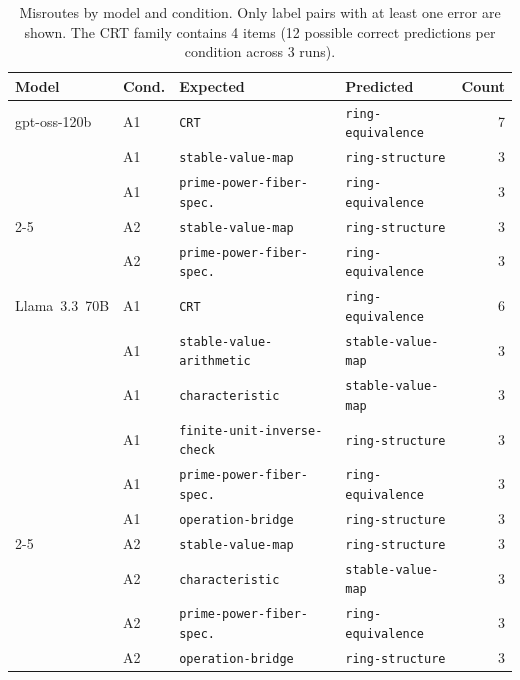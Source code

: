 \documentclass[11pt]{article}
\begin{document}
\begin{table}[htbp]
\centering
\caption{Misroutes by model and condition. Only label pairs with at least one
         error are shown. The CRT family contains 4 items (12 possible correct
         predictions per condition across 3 runs).}
\label{tab:misroutes}
\begin{tabular}{llll r}
\toprule
\textbf{Model} & \textbf{Cond.} & \textbf{Expected} & \textbf{Predicted} & \textbf{Count} \\
\midrule
gpt-oss-120b & A1 & \texttt{CRT}                       & \texttt{ring-equivalence}  & 7 \\
             & A1 & \texttt{stable-value-map}          & \texttt{ring-structure}    & 3 \\
             & A1 & \texttt{prime-power-fiber-spec.}   & \texttt{ring-equivalence}  & 3 \\
\cmidrule{2-5}
             & A2 & \texttt{stable-value-map}          & \texttt{ring-structure}    & 3 \\
             & A2 & \texttt{prime-power-fiber-spec.}   & \texttt{ring-equivalence}  & 3 \\
\midrule
Llama~3.3~70B & A1 & \texttt{CRT}                      & \texttt{ring-equivalence}  & 6 \\
              & A1 & \texttt{stable-value-arithmetic}  & \texttt{stable-value-map}  & 3 \\
              & A1 & \texttt{characteristic}           & \texttt{stable-value-map}  & 3 \\
              & A1 & \texttt{finite-unit-inverse-check}& \texttt{ring-structure}    & 3 \\
              & A1 & \texttt{prime-power-fiber-spec.}  & \texttt{ring-equivalence}  & 3 \\
              & A1 & \texttt{operation-bridge}         & \texttt{ring-structure}    & 3 \\
\cmidrule{2-5}
              & A2 & \texttt{stable-value-map}         & \texttt{ring-structure}    & 3 \\
              & A2 & \texttt{characteristic}           & \texttt{stable-value-map}  & 3 \\
              & A2 & \texttt{prime-power-fiber-spec.}  & \texttt{ring-equivalence}  & 3 \\
              & A2 & \texttt{operation-bridge}         & \texttt{ring-structure}    & 3 \\
\bottomrule
\end{tabular}
\end{table}
\end{document}
